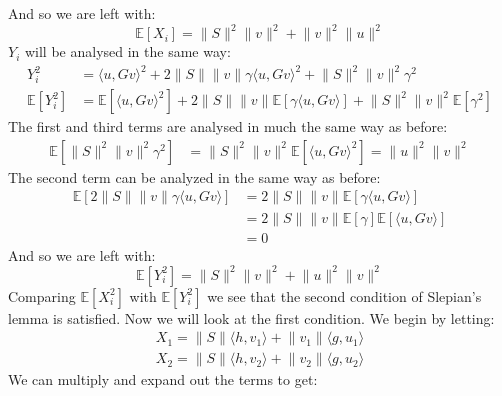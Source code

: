 And so we are left with:
\begin{equation*}
    \mathds{E}\left[X_i\right] = \lVert S \rVert^2 \lVert v \rVert^2 +  \lVert v \rVert^2\lVert u \rVert^2
\end{equation*}
$Y_i$ will be analysed in the same way:
\begin{align*}
    Y_i^2 &= \langle u, Gv \rangle^2 + 2\lVert S \rVert\lVert v \rVert\gamma\langle u, Gv \rangle^2 + \lVert S \rVert^2\lVert v \rVert^2\gamma^2 \\
    \mathds{E}\left[Y_i^2\right] &= \mathds{E}\left[\langle u, Gv\rangle^2\right] + 2\lVert S \rVert\lVert v \rVert\mathds{E}\left[\gamma \langle u, Gv\rangle\right] + \lVert S \rVert^2\lVert v \rVert^2\mathds{E}\left[\gamma^2\right]
\end{align*}
The first and third terms are analysed in much the same way as before:
\begin{align*}
    \mathds{E}\left[ \lVert S \rVert^2 \lVert v \rVert^2 \gamma^2\right] &= \lVert S \rVert^2 \lVert v \rVert^2
    \mathds{E}\left[ \langle u, Gv\rangle^2\right] = \lVert u \rVert^2 \lVert v \rVert^2
\end{align*}
The second term can be analyzed in the same way as before:
\begin{align*}
    \mathds{E}\left[2\lVert S \rVert\lVert v \rVert\gamma \langle u, Gv\rangle\right] &= 2\lVert S \rVert\lVert v \rVert\mathds{E}\left[\gamma \langle u, Gv\rangle\right] \\
                                                                                      &= 2\lVert S \rVert\lVert v \rVert\mathds{E}\left[\gamma\right]\mathds{E}\left[\langle u, Gv\rangle\right] \\
                                                                                      &= 0
\end{align*}
And so we are left with:
\begin{equation*}
    \mathds{E}\left[Y_i^2\right] = \lVert S \rVert^2 \lVert v \rVert^2 + \lVert u \rVert^2 \lVert v \rVert^2
\end{equation*}
Comparing $\mathds{E}\left[X_i^2\right]$ with $\mathds{E}\left[Y_i^2\right]$ we see that the second condition of
Slepian's lemma is satisfied. Now we will look at the first condition. We begin by letting:
\begin{align*}
    X_1 = \lVert S \rVert \langle h, v_1 \rangle + \lVert v_1 \rVert \langle g, u_1 \rangle \\
    X_2 = \lVert S \rVert \langle h, v_2 \rangle + \lVert v_2 \rVert \langle g, u_2 \rangle
\end{align*} 
We can multiply and expand out the terms to get:


